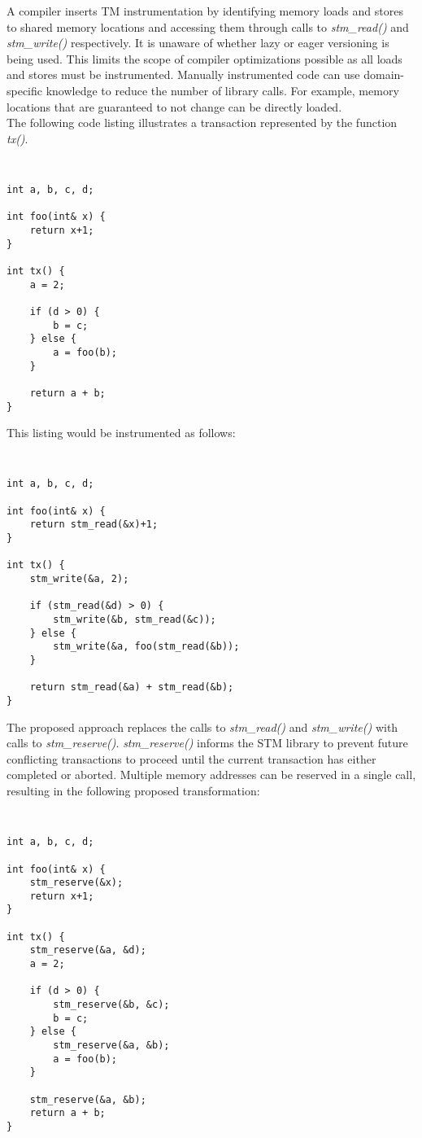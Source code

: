 \documentclass[letterpaper,twocolumn,10pt]{article}
\begin{document}
A compiler inserts TM instrumentation by identifying memory loads and stores to shared memory locations and accessing them through calls to \emph{stm\_read()} and \emph{stm\_write()} respectively. It is unaware of whether lazy or eager versioning is being used. This limits the scope of compiler optimizations possible as all loads and stores must be instrumented. Manually instrumented code can use domain-specific knowledge to reduce the number of library calls. For example, memory locations that are guaranteed to not change can be directly loaded.\\

The following code listing illustrates a transaction represented by the function \emph{tx()}.

{\tt \small
\begin{verbatim}
int a, b, c, d;

int foo(int& x) {
    return x+1;
}

int tx() {
    a = 2;

    if (d > 0) {
        b = c;
    } else {
        a = foo(b);
    }

    return a + b;
}
\end{verbatim}
}

\noindent
This listing would be instrumented as follows:

{\tt \small
\begin{verbatim}
int a, b, c, d;

int foo(int& x) {
    return stm_read(&x)+1;
}

int tx() {
    stm_write(&a, 2);

    if (stm_read(&d) > 0) {
        stm_write(&b, stm_read(&c));
    } else {
        stm_write(&a, foo(stm_read(&b));
    }

    return stm_read(&a) + stm_read(&b);
}
\end{verbatim}
}

\noindent
The proposed approach replaces the calls to \emph{stm\_read()} and \emph{stm\_write()} with calls to \emph{stm\_reserve()}. \emph{stm\_reserve()} informs the STM library to prevent future conflicting transactions to proceed until the current transaction has either completed or aborted. Multiple memory addresses can be reserved in a single call, resulting in the following proposed transformation:

{\tt \small
\begin{verbatim}
int a, b, c, d;

int foo(int& x) {
    stm_reserve(&x);
    return x+1;
}

int tx() {
    stm_reserve(&a, &d);
    a = 2;

    if (d > 0) {
        stm_reserve(&b, &c);
        b = c;
    } else {
        stm_reserve(&a, &b);
        a = foo(b);
    }

    stm_reserve(&a, &b);
    return a + b;
}
\end{verbatim}
}
\end{document}
